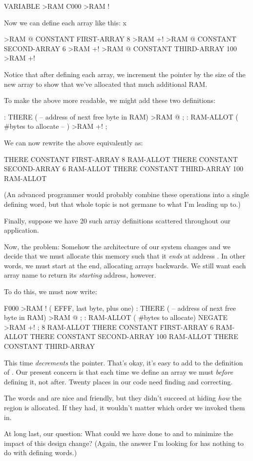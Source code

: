 \begin{enumerate}
\begin{Code}
VARIABLE >RAM
C000 >RAM !
\end{Code}
Now we can define each array like this:
x\begin{Code}
>RAM @ CONSTANT FIRST-ARRAY    8 >RAM +!
>RAM @ CONSTANT SECOND-ARRAY   6 >RAM +!
>RAM @ CONSTANT THIRD-ARRAY  100 >RAM +!
\end{Code}
Notice that after defining each array, we increment the pointer by the
size of the new array to show that we've allocated that much additional
RAM.

\goodbreak
To make the above more readable, we might add these two
definitions:

\begin{Code}
: THERE ( -- address of next free byte in RAM)
     >RAM @ ;
: RAM-ALLOT ( #bytes to allocate -- )  >RAM +! ;
\end{Code}
We can now rewrite the above equivalently as:

\begin{Code}
THERE CONSTANT FIRST-ARRAY    8 RAM-ALLOT
THERE CONSTANT SECOND-ARRAY   6 RAM-ALLOT
THERE CONSTANT THIRD-ARRAY  100 RAM-ALLOT
\end{Code}
(An advanced \Forth{} programmer would probably combine these operations
into a single defining word, but that whole topic is not germane to
what I'm leading up to.)

Finally, suppose we have 20 such array definitions scattered
throughout our application.

Now, the problem: Somehow the architecture of our system changes and
we decide that we must allocate this memory such that it \emph{ends}
at  address . In other words, we must start at the
end, allocating arrays backwards. We still want each array name to return
its \emph{starting} address, however.

To do this, we must now write:

\begin{Code}
F000 >RAM ! ( EFFF, last byte, plus one)
: THERE ( -- address of next free byte in RAM)
     >RAM @ ;
: RAM-ALLOT  ( #bytes to allocate)  NEGATE >RAM +! ;
  8 RAM-ALLOT  THERE CONSTANT FIRST-ARRAY
  6 RAM-ALLOT  THERE CONSTANT SECOND-ARRAY
100 RAM-ALLOT  THERE CONSTANT THIRD-ARRAY
\end{Code}
This time  \emph{decrements} the pointer. That's okay,
it's easy to add  to the definition of .
Our present concern is that each time we define an array we must
 \emph{before} defining it, not after. Twenty places in
our code need finding and correcting.

The words  and  are nice and friendly, but
they didn't succeed at hiding \emph{how} the region is allocated. If they
had, it wouldn't matter which order we invoked them in.

At long last, our question: What could we have done to  and
 to minimize the impact of this design change? (Again, the
answer I'm looking for has nothing to do with defining words.)
\end{enumerate}
